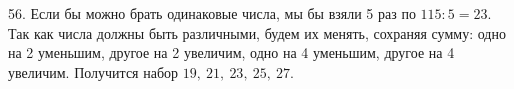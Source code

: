 56. Если бы можно брать одинаковые числа, мы бы взяли 5 раз по $115:5=23.$ Так как числа должны быть различными, будем их менять, сохраняя сумму: одно на 2 уменьшим, другое на 2 увеличим, одно на 4 уменьшим, другое на 4 увеличим. Получится набор $19,\ 21,\ 23,\ 25,\ 27.$\\
